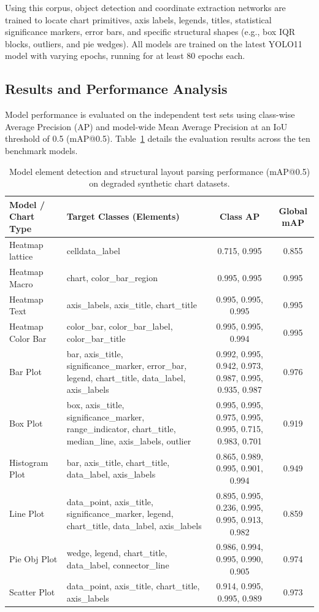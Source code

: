 \documentclass[11pt,twocolumn]{article}
\begin{document}
Using this corpus, object detection and coordinate extraction networks are trained to locate chart primitives, axis labels, legends, titles, statistical significance markers, error bars, and specific structural shapes (e.g., box IQR blocks, outliers, and pie wedges). All models are trained on the latest YOLO11 model with varying epochs, running for at least 80 epochs each.

\subsection{Results and Performance Analysis}\label{sec:results}

Model performance is evaluated on the independent test sets using class-wise Average Precision (AP) and model-wide Mean Average Precision at an IoU threshold of 0.5 (mAP@0.5). Table~\ref{tab:evaluation_results} details the evaluation results across the ten benchmark models.

\begin{table}[htbp]
\centering
\caption{Model element detection and structural layout parsing performance (mAP@0.5) on degraded synthetic chart datasets.}\label{tab:evaluation_results}
\small
\begin{tabularx}{\textwidth}{l X c c}
\toprule
\textbf{Model / Chart Type} & \textbf{Target Classes (Elements)} & \textbf{Class AP} & \textbf{Global mAP} \\
\midrule
Heatmap lattice & celldata\_label & 0.715, 0.995 & 0.855 \\
Heatmap Macro & chart, color\_bar\_region & 0.995, 0.995 & 0.995 \\
Heatmap Text & axis\_labels, axis\_title, chart\_title & 0.995, 0.995, 0.995 & 0.995 \\
Heatmap Color Bar & color\_bar, color\_bar\_label, color\_bar\_title & 0.995, 0.995, 0.994 & 0.995 \\
Bar Plot & bar, axis\_title, significance\_marker, error\_bar, legend, chart\_title, data\_label, axis\_labels & 0.992, 0.995, 0.942, 0.973, 0.987, 0.995, 0.935, 0.987 & 0.976 \\
Box Plot & box, axis\_title, significance\_marker, range\_indicator, chart\_title, median\_line, axis\_labels, outlier & 0.995, 0.995, 0.975, 0.995, 0.995, 0.715, 0.983, 0.701 & 0.919 \\
Histogram Plot & bar, axis\_title, chart\_title, data\_label, axis\_labels & 0.865, 0.989, 0.995, 0.901, 0.994 & 0.949 \\
Line Plot & data\_point, axis\_title, significance\_marker, legend, chart\_title, data\_label, axis\_labels & 0.895, 0.995, 0.236, 0.995, 0.995, 0.913, 0.982 & 0.859 \\
Pie Obj Plot & wedge, legend, chart\_title, data\_label, connector\_line & 0.986, 0.994, 0.995, 0.990, 0.905 & 0.974 \\
Scatter Plot & data\_point, axis\_title, chart\_title, axis\_labels & 0.914, 0.995, 0.995, 0.989 & 0.973 \\
\bottomrule
\end{tabularx}
\end{table}
\end{document}

